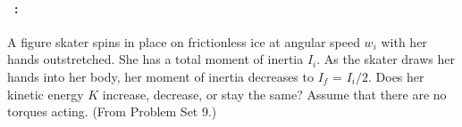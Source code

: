 \documentclass[12pt]{article} 
\begin{document}
\vfill

\paragraph{\problemname~\theproblem:}%
A figure skater spins in place on frictionless ice at angular speed
$w_i$ with her hands outstretched. She has a total moment of inertia
$I_i$. As the skater draws her hands into her body, her moment of
inertia decreases to $I_f$ = $I_i/2$. Does her kinetic energy $K$
increase, decrease, or stay the same? Assume that there are no torques
acting.
(From Problem Set 9.)

\vfill
~
\end{document}
